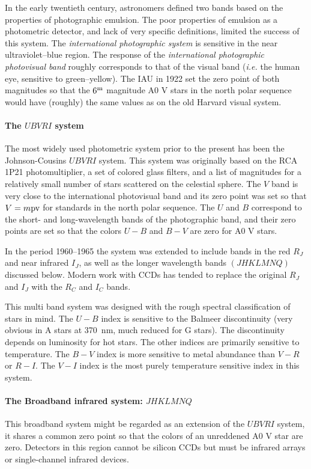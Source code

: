In the
early twentieth century, astronomers defined two bands based on the
properties of photographic emulsion. The
poor properties of emulsion as a photometric detector, and lack of 
very specific definitions, limited the success of this system. The
{\it international photographic system} is sensitive in the near
ultraviolet--blue region. The response of the {\it international
  photographic photovisual band} roughly corresponds to that of the
visual band ({\it i.e.} the human eye, sensitive to green--yellow). The
IAU in 1922 set the zero point of both magnitudes so that the $6^{\rm
  m}$ magnitude A0 V stars in the north polar sequence would have
(roughly) the same values as on the old Harvard visual system.

\paragraph{The $UBVRI$ system} The most widely used photometric system
prior to the present has been the Johnson-Cousins $UBVRI$ system. This
system was originally based on the RCA 1P21 photomultiplier, a set of
colored glass filters, and a list of magnitudes for a relatively small
number of stars scattered on the celestial sphere. The $V$ band is very
close to the international photovisual band and its zero point was set
so that $V=m{\rm pv}$ for standards in the north polar sequence. The $U$
and $B$ correspond to the short- and long-wavelength bands of the
photographic band, and their zero points are set so that the colors
$U-B$ and $B-V$ are zero for A0 V stars. 

In the period 1960--1965 the system was extended to include bands in
the red $R_J$ and near infrared $I_J$, as well as the longer
wavelength bands $(JHKLMNQ)$ discussed below. Modern work with CCDs
has tended to replace the original $R_J$ and $I_J$ with the $R_C$ and
$I_C$ bands. 

This multi band system was designed with the rough spectral
classification of stars in mind. The $U-B$ index is sensitive to the
Balmeer discontinuity (very obvious in A stars at 370~nm, much reduced
for G stars). The discontinuity  depends on luminosity for hot
stars. The other indices are primarily sensitive to temperature. The
$B-V$ index is more sensitive to metal abundance than $V-R$ or
$R-I$. The $V-I$ index is the most purely temperature sensitive index
in this system. 
\paragraph{The Broadband infrared system: $JHKLMNQ$} This broadband
system might be regarded as an extension of the $UBVRI$ system, it
shares a common zero point so that the colors of an unreddened A0 V
star are zero. Detectors in this region cannot be silicon CCDs but
must be infrared arrays or single-channel infrared devices. 

